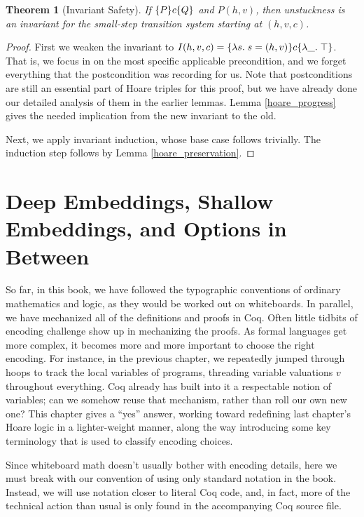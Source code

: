 \documentclass{amsbook}
\newtheorem{theorem}{Theorem}[chapter]
\theoremstyle{definition}
\theoremstyle{remark}
\numberwithin{section}{chapter}
\numberwithin{equation}{chapter}
\begin{document}
\begin{theorem}[Invariant Safety]
\invariants
  If $\{P\} c \{Q\}$ and $P(h, v)$, then unstuckness is an invariant for the small-step transition system starting at $(h, v, c)$.
\end{theorem}
\begin{proof}
  First we weaken the invariant to $I(h, v, c) = \{\lambda s. \; s = (h, v)\} c \{\lambda \_. \; \top\}$.
  That is, we focus in on the most specific applicable precondition, and we forget everything that the postcondition was recording for us.
  Note that postconditions are still an essential part of Hoare triples for this proof, but we have already done our detailed analysis of them in the earlier lemmas.
  Lemma \ref{hoare_progress} gives the needed implication from the new invariant to the old.
  
  Next, we apply invariant induction, whose base case follows trivially.
  The induction step follows by Lemma \ref{hoare_preservation}.
\end{proof}



\chapter{Deep Embeddings, Shallow Embeddings, and Options in Between}
\label{embeddings}

So far, in this book, we have followed the typographic conventions of ordinary mathematics and logic, as they would be worked out on whiteboards.
In parallel, we have mechanized all of the definitions and proofs in Coq.
Often little tidbits of encoding challenge show up in mechanizing the proofs.
As formal languages get more complex, it becomes more and more important to choose the right encoding.
For instance, in the previous chapter, we repeatedly jumped through hoops to track the local variables of programs, threading variable valuations $v$ throughout everything.
Coq already has built into it a respectable notion of variables; can we somehow reuse that mechanism, rather than roll our own new one?
This chapter gives a ``yes'' answer, working toward redefining last chapter's Hoare logic in a lighter-weight manner, along the way introducing some key terminology that is used to classify encoding choices.

Since whiteboard math doesn't usually bother with encoding details, here we must break with our convention of using only standard notation in the book.
Instead, we will use notation closer to literal Coq code, and, in fact, more of the technical action than usual is only found in the accompanying Coq source file.
\end{document}
